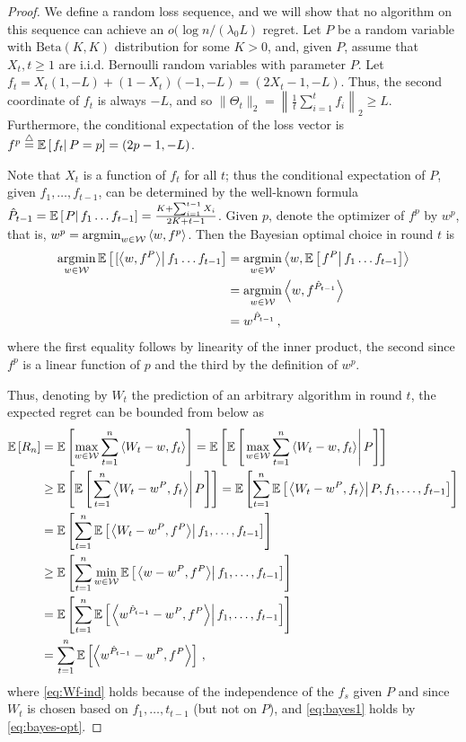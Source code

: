 \begin{proof}
 We define a random loss sequence, and we will show that no algorithm on this sequence can achieve an $o(\log n/ (\lambda_0 L)$ regret.
	Let $P$ be a random variable with $\mbox{Beta}(K,K)$ distribution for some $K>0$, and, given $P$, assume that $X_t, t \ge 1$ are i.i.d. Bernoulli random variables with parameter $P$. Let $f_t = X_t (1, -L) + (1-X_t) (-1, -L) = (2X_t - 1, -L)$. Thus, the second coordinate of $f_t$ is always $-L$, and so $\|\Theta_t\|_2 = \left\| \tfrac{1}{t} \sum_{i=1}^t f_i \right\|_2 \ge L$. Furthermore, the conditional expectation of the loss vector is $f^p \overset{\triangle}{=} \mathbb{E}\left[ \left. f_t \right| P=p \right] = (2p - 1, -L)$. 
	
	Note that $X_t$ is a function of $f_t$ for all $t$; thus the conditional expectation of $P$, given $f_1,\ldots,f_{t-1}$, can be determined by the well-known formula $\hat{P}_{t-1}= \mathbb{E}\left[ \left. P \right| f_1 \ldots f_{t-1} \right] = \frac{K+\sum_{i=1}^{t-1} X_i}{2K+t-1}$.
	Given $p$, denote the optimizer of $f^p$ by $w^p$, that is, $w^p = \operatorname*{argmin}_{w \in \mathcal{W}} \left\langle w,f^p\right\rangle$. 	
	Then the Bayesian optimal choice in round $t$ is 
	\begin{align}
	\operatorname*{argmin}_{w \in \mathcal W} \mathbb{E}\left[ \left. [\left\langle w, f^P\right\rangle \right|  f_1\ldots f_{t-1} \right]
	&= \operatorname*{argmin}_{w \in \mathcal W} \left\langle w, \mathbb{E}\left[ \left. f^P \right| f_1 \ldots f_{t-1} \right]\right\rangle \nonumber \\
	&= \operatorname*{argmin}_{w \in \mathcal W} \left\langle w, f^{\hat P_{t-1}}\right\rangle \nonumber \\
	&= w^{\hat P_{t-1}}\,,
	\label{eq:bayes-opt}
	\end{align}
	where the first equality follows by linearity of the inner product, the second since $f^p$ is a linear function of $p$ and the third
	by the definition of $w^p$.
	
	Thus, denoting by $W_t$ the prediction of an arbitrary algorithm in round $t$, the expected regret can be bounded from below as 
	\begin{align}
	\mathbb{E}\left[ R_n \right]
	&= \mathbb{E}\left[ \max_{w \in \mathcal{W}} \sum_{t=1}^n \left\langle W_t - w, f_t\right\rangle \right]
	= \mathbb{E}\left[  \mathbb{E}\left[ \left. \max_{w \in \mathcal{W}} \sum_{t=1}^n \left\langle W_t - w, f_t\right\rangle \right| P \right]  \right] \nonumber \\
	& \ge  \mathbb{E}\left[  \mathbb{E}\left[ \left.  \sum_{t=1}^n \left\langle W_t - w^P, f_t\right\rangle \right| P \right]  \right] = \mathbb{E}\left[ \sum_{t=1}^n  \mathbb{E}\left[ \left.  \left\langle W_t - w^P, f_t\right\rangle  \right| P, f_1,\ldots,f_{t-1} \right] \right] \nonumber \\
	& = \mathbb{E}\left[ \sum_{t=1}^n  \mathbb{E}\left[ \left.  \left\langle W_t - w^P, f^P\right\rangle  \right| f_1,\ldots,f_{t-1} \right] \right] \label{eq:Wf-ind} \\
	& \ge \mathbb{E}\left[ \sum_{t=1}^n  \min_{w \in \mathcal{W}} \mathbb{E}\left[ \left.  \left\langle w- w^P, f^P\right\rangle  \right| f_1,\ldots,f_{t-1} \right] \right] \nonumber \\
	& = \mathbb{E}\left[ \sum_{t=1}^n  \mathbb{E}\left[ \left.  \left\langle w^{\hat{P}_{t-1}}- w^P, f^P\right\rangle  \right| f_1,\ldots,f_{t-1} \right] \right]  \label{eq:bayes1} \\
	& = \sum_{t=1}^n \mathbb{E}\left[ \left\langle w^{\hat{P}_{t-1}} - w^P, f^P\right\rangle \right] \,, \nonumber 
	\end{align}
	where   \eqref{eq:Wf-ind} holds because of the independence of the $f_s$ given $P$ and since $W_t$ is chosen based on $f_1,\ldots,t_{t-1}$ (but not on $P$),
	and \eqref{eq:bayes1} holds by \eqref{eq:bayes-opt}. 
	

\end{proof}

